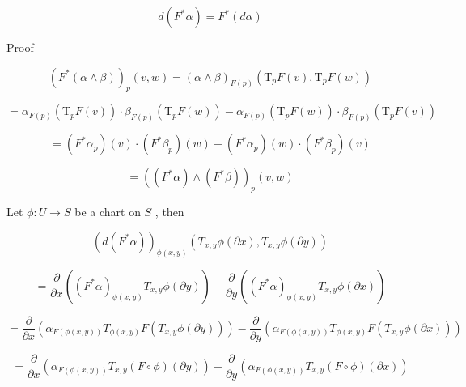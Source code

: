 \documentclass[lang=cn,a4paper,11pt,openany,twoside]{elegantbook}
\begin{document}
\[
d\left( {{F}^{ * }\alpha }\right)  = {F}^{ * }\left( {d\alpha }\right)
\]

Proof

\[
{\left( {F}^{ * }\left( \alpha  \land  \beta \right) \right) }_{p}\left( {v,w}\right)  = {\left( \alpha  \land  \beta \right) }_{F\left( p\right) }\left( {{\mathrm{T}}_{p}F\left( v\right) ,{\mathrm{T}}_{p}F\left( w\right) }\right)
\]

\[
= {\alpha }_{F\left( p\right) }\left( {{\mathrm{T}}_{p}F\left( v\right) }\right)  \cdot  {\beta }_{F\left( p\right) }\left( {{\mathrm{T}}_{p}F\left( w\right) }\right)  - {\alpha }_{F\left( p\right) }\left( {{\mathrm{T}}_{p}F\left( w\right) }\right)  \cdot  {\beta }_{F\left( p\right) }\left( {{\mathrm{T}}_{p}F\left( v\right) }\right)
\]

\[
= \left( {{F}^{ * }{\alpha }_{p}}\right) \left( v\right)  \cdot  \left( {{F}^{ * }{\beta }_{p}}\right) \left( w\right)  - \left( {{F}^{ * }{\alpha }_{p}}\right) \left( w\right)  \cdot  \left( {{F}^{ * }{\beta }_{p}}\right) \left( v\right)
\]

\[
= {\left( \left( {F}^{ * }\alpha \right)  \land  \left( {F}^{ * }\beta \right) \right) }_{p}\left( {v,w}\right)
\]

Let \(\phi  : U \rightarrow  S\) be a chart on \(S\) , then

\[
{\left( d\left( {F}^{ * }\alpha \right) \right) }_{\phi \left( {x,y}\right) }\left( {{T}_{x,y}\phi \left( {\partial x}\right) ,{T}_{x,y}\phi \left( {\partial y}\right) }\right)
\]

\[
= \frac{\partial }{\partial x}\left( {{\left( {F}^{ * }\alpha \right) }_{\phi \left( {x,y}\right) }{T}_{x,y}\phi \left( {\partial y}\right) }\right)  - \frac{\partial }{\partial y}\left( {{\left( {F}^{ * }\alpha \right) }_{\phi \left( {x,y}\right) }{T}_{x,y}\phi \left( {\partial x}\right) }\right)
\]

\[
= \frac{\partial }{\partial x}\left( {{\alpha }_{F\left( {\phi \left( {x,y}\right) }\right) }{T}_{\phi \left( {x,y}\right) }F\left( {{T}_{x,y}\phi \left( {\partial y}\right) }\right) }\right)  - \frac{\partial }{\partial y}\left( {{\alpha }_{F\left( {\phi \left( {x,y}\right) }\right) }{T}_{\phi \left( {x,y}\right) }F\left( {{T}_{x,y}\phi \left( {\partial x}\right) }\right) }\right)
\]

\[
= \frac{\partial }{\partial x}\left( {{\alpha }_{F\left( {\phi \left( {x,y}\right) }\right) }{T}_{x,y}\left( {F \circ  \phi }\right) \left( {\partial y}\right) }\right)  - \frac{\partial }{\partial y}\left( {{\alpha }_{F\left( {\phi \left( {x,y}\right) }\right) }{T}_{x,y}\left( {F \circ  \phi }\right) \left( {\partial x}\right) }\right)
\]
\end{document}
